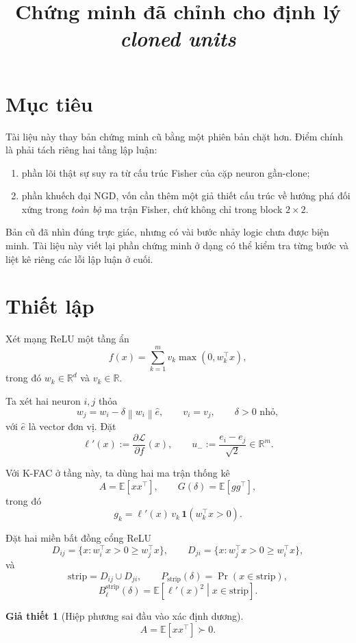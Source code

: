 \documentclass[11pt,a4paper]{article}
\title{Chứng minh đã chỉnh cho định lý \emph{cloned units}}
\author{}
\date{}
\newtheorem{assumption}{Giả thiết}
\newcommand{\R}{\mathbb{R}}
\newcommand{\E}{\mathbb{E}}
\newcommand{\cL}{\mathcal L}
\newcommand{\norm}[1]{\left\lVert #1 \right\rVert}
\begin{document}
\maketitle

\section{Mục tiêu}

Tài liệu này thay bản chứng minh cũ bằng một phiên bản chặt hơn. Điểm chính là
phải tách riêng hai tầng lập luận:
\begin{enumerate}[label=(\roman*)]
    \item phần lõi thật sự suy ra từ cấu trúc Fisher của cặp neuron gần-clone;
    \item phần khuếch đại NGD, vốn cần thêm một giả thiết cấu trúc về hướng phá
    đối xứng trong \emph{toàn bộ} ma trận Fisher, chứ không chỉ trong block
    $2\times 2$.
\end{enumerate}

Bản cũ đã nhìn đúng trực giác, nhưng có vài bước nhảy logic chưa được biện minh.
Tài liệu này viết lại phần chứng minh ở dạng có thể kiểm tra từng bước và liệt
kê riêng các lỗi lập luận ở cuối.

\section{Thiết lập}

Xét mạng ReLU một tầng ẩn
\[
f(x) = \sum_{k=1}^m v_k \max(0, w_k^\top x),
\]
trong đó $w_k \in \R^d$ và $v_k \in \R$.

Ta xét hai neuron $i,j$ thỏa
\[
w_j = w_i - \delta \norm{w_i}\hat e,
\qquad
v_i = v_j,
\qquad
\delta > 0 \text{ nhỏ},
\]
với $\hat e$ là vector đơn vị. Đặt
\[
\ell'(x) := \frac{\partial \cL}{\partial f}(x),
\qquad
u_- := \frac{e_i - e_j}{\sqrt 2} \in \R^m.
\]

Với K-FAC ở tầng này, ta dùng hai ma trận thống kê
\[
A = \E[xx^\top],
\qquad
G(\delta) = \E[g g^\top],
\]
trong đó
\[
g_k = \ell'(x)\, v_k\, \mathbf 1(w_k^\top x > 0).
\]

Đặt hai miền bất đồng cổng ReLU
\[
D_{ij} = \{x : w_i^\top x > 0 \ge w_j^\top x\},
\qquad
D_{ji} = \{x : w_j^\top x > 0 \ge w_i^\top x\},
\]
và
\[
\mathrm{strip} = D_{ij} \cup D_{ji},
\qquad
P_{\mathrm{strip}}(\delta) = \Pr(x \in \mathrm{strip}),
\]
\[
B_\ell^{\mathrm{strip}}(\delta)
=
\E\!\left[\ell'(x)^2 \middle| x \in \mathrm{strip}\right].
\]

\begin{assumption}[Hiệp phương sai đầu vào xác định dương]
\[
A = \E[xx^\top] \succ 0.
\]
\end{assumption}
\end{document}

